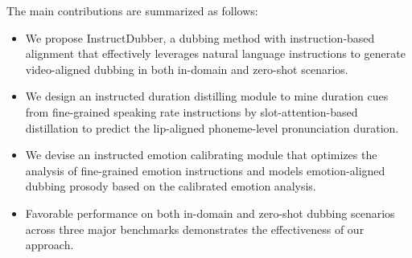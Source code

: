 The main contributions are summarized as follows:
\begin{itemize}
\item We propose InstructDubber, a dubbing method with instruction-based alignment that effectively leverages natural language instructions to generate video-aligned dubbing in both in-domain and zero-shot scenarios.
\item We design an instructed duration distilling module to mine duration cues from fine-grained speaking rate instructions by slot-attention-based distillation to predict the lip-aligned phoneme-level pronunciation duration.
\item We devise an instructed emotion calibrating module that optimizes the analysis of fine-grained emotion instructions and models emotion-aligned dubbing prosody based on the calibrated emotion analysis.
\item Favorable performance on both in-domain and zero-shot dubbing scenarios across three major benchmarks demonstrates the effectiveness of our approach.
\end{itemize}









 


